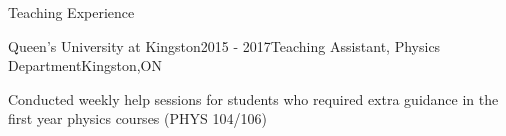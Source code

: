 \documentclass{resume2} %
\begin{document}
\begin{rSection}{Teaching Experience}
	
	\begin{rSubsection}{Queen's University at Kingston}{2015 - 2017}{Teaching Assistant, Physics Department}{Kingston,ON}
		\item Conducted weekly help sessions for students who required extra guidance in the first year physics courses (PHYS 104/106)
	\end{rSubsection}

\end{rSection}

\end{document}
